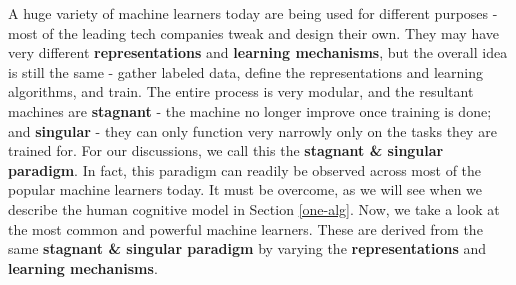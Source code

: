 \documentclass[12pt]{article}  %
\begin{document}
A huge variety of machine learners today are being used for different purposes - most of the leading tech companies tweak and design their own. They may have very different {\bf representations} and {\bf learning mechanisms}, but the overall idea is still the same - gather labeled data, define the representations and learning algorithms, and train. The entire process is very modular, and the resultant machines are {\bf stagnant} - the machine no longer improve once training is done; and {\bf singular} - they can only function very narrowly only on the tasks they are trained for. For our discussions, we call this the {\bf stagnant \& singular paradigm}. In fact, this paradigm can readily be observed across most of the popular machine learners today. It must be overcome, as we will see when we describe the human cognitive model in Section \ref{one-alg}. Now, we take a look at the most common and powerful machine learners. These are derived from the same {\bf stagnant \& singular paradigm} by varying the {\bf representations} and {\bf learning mechanisms}.





\end{document}
